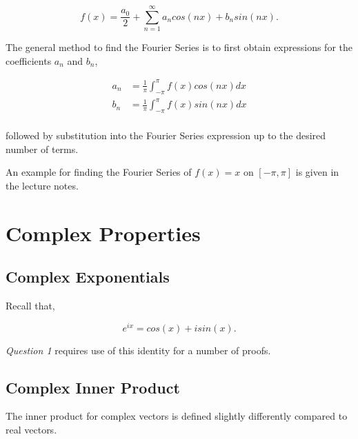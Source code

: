 \documentclass[12pt]{article}
\begin{document}
\vspace{2mm}  

$$ f(x) = \frac{a_0}{2} + \sum_{n=1}^\infty a_n cos(nx) + b_n sin(nx). $$

\vspace{4mm}

The general method to find the Fourier Series is to first obtain expressions for the coefficients $a_n$ and $b_n$,

\begin{align*}
a_n &= \frac{1}{\pi} \int_{-\pi}^{\pi} f(x)cos(nx) dx \\[1em]
b_n &= \frac{1}{\pi} \int_{-\pi}^{\pi} f(x)sin(nx) dx \\[1em]
\end{align*}

followed by substitution into the Fourier Series expression up to the desired number of terms.

\vspace{4mm}

An example for finding the Fourier Series of $f(x) = x$ on $[-\pi,\pi]$ is given in the lecture notes.

\newpage

\section{Complex Properties}

\subsection{Complex Exponentials}

\vspace{4mm}

Recall that,

\vspace{2mm}

$$ e^{ix} = cos(x) + isin(x).$$

\vspace{4mm}

\textit{Question 1} requires use of this identity for a number of proofs.

\subsection{Complex Inner Product}

\vspace{4mm}

The inner product for complex vectors is defined slightly differently compared to real vectors.
\end{document}
